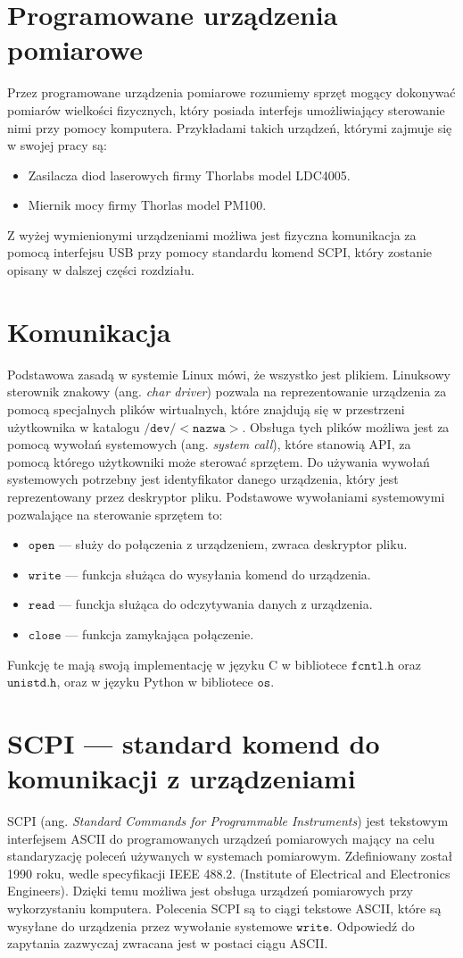\section{Programowane urządzenia pomiarowe}
Przez programowane urządzenia pomiarowe rozumiemy sprzęt mogący dokonywać pomiarów wielkości fizycznych,
który posiada interfejs umożliwiający sterowanie nimi przy pomocy komputera. Przykładami takich urządzeń, którymi zajmuje się w swojej pracy są:
\begin{itemize}
\item Zasilacza diod laserowych firmy Thorlabs model LDC4005.
\item Miernik mocy firmy Thorlas model PM100.
\end{itemize}
Z wyżej wymienionymi urządzeniami możliwa jest fizyczna komunikacja za pomocą interfejsu USB przy pomocy standardu komend SCPI,
który zostanie opisany w dalszej części rozdziału.

\section{Komunikacja}
Podstawowa zasadą w systemie Linux mówi, że wszystko jest plikiem. Linuksowy sterownik znakowy (ang. \textit{char driver})
pozwala na reprezentowanie urządzenia za pomocą specjalnych plików wirtualnych, które znajdują się w przestrzeni
użytkownika w katalogu $\mathtt{/dev/<nazwa>}$. Obsługa tych plików możliwa jest za pomocą wywołań systemowych (ang. \textit{system call}),
które stanowią API, za pomocą którego użytkowniki może sterować sprzętem. Do używania wywołań systemowych potrzebny jest
identyfikator danego urządzenia, który jest reprezentowany przez deskryptor pliku.
Podstawowe wywołaniami systemowymi pozwalające na sterowanie sprzętem to:
\begin{itemize}
\item $\mathtt{open}$ --- służy do połączenia z urządzeniem, zwraca deskryptor pliku.
\item $\mathtt{write}$ --- funkcja służąca do wysyłania komend do urządzenia.
\item $\mathtt{read}$ --- funckja służąca do odczytywania danych z urządzenia.
\item $\mathtt{close}$ --- funkcja zamykająca połączenie.
\end{itemize}
Funkcję te mają swoją implementację w języku C w bibliotece $\mathtt{fcntl.h}$ oraz $\mathtt{unistd.h}$,
oraz w języku Python w bibliotece $\mathtt{os}$.
\section{SCPI --- standard komend do komunikacji z urządzeniami}
SCPI (ang. \textit{Standard Commands for Programmable Instruments}) jest tekstowym interfejsem ASCII do programowanych
urządzeń pomiarowych mający na celu standaryzację poleceń używanych w systemach pomiarowym. Zdefiniowany został 1990 roku,
wedle specyfikacji IEEE 488.2. (Institute of Electrical and Electronics Engineers).
Dzięki temu możliwa jest obsługa urządzeń pomiarowych przy wykorzystaniu komputera.
Polecenia SCPI są to ciągi tekstowe ASCII, które są wysyłane do urządzenia przez wywołanie systemowe $\mathtt{write}$.
Odpowiedź do zapytania zazwyczaj zwracana jest w postaci ciągu ASCII.

